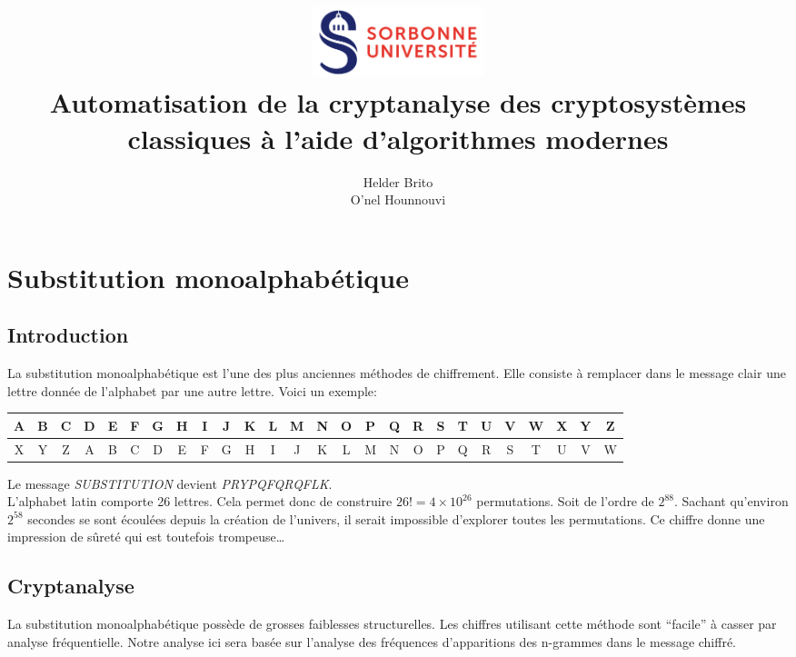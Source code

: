 \documentclass[a4paper]{article}
\title{
    \includegraphics[width=5cm]{logo_su.jpg} \\[1em]
    \Huge Automatisation de la cryptanalyse des cryptosystèmes classiques à l’aide d’algorithmes modernes
}
\author{Helder Brito\\O'nel Hounnouvi}
\date{}
\begin{document}
\maketitle 
\clearpage 
\tableofcontents
\clearpage 
\section{Substitution monoalphabétique}
\subsection{Introduction}
La substitution monoalphabétique est l'une des plus anciennes méthodes de chiffrement. Elle consiste
à remplacer dans le message clair une lettre donnée de l'alphabet par une autre lettre. Voici un exemple:

\vspace{1em}
    \begin{adjustbox}{width=\textwidth,center}
        \begin{tabular}{|c|c|c|c|c|c|c|c|c|c|c|c|c|c|c|c|c|c|c|c|c|c|c|c|c|c|}
            \hline
            A & B & C & D & E & F & G & H & I & J & K & L & M & N & O & P & Q & R & S & T & U & V & W & X & Y & Z \\
            \hline
            X & Y & Z & A & B & C & D & E & F & G & H & I & J & K & L & M & N & O & P & Q & R & S & T & U & V & W \\
            \hline
        \end{tabular}
    \end{adjustbox}
\vspace{1em}

Le message \textit{SUBSTITUTION} devient \textit{PRYPQFQRQFLK}.\\

L'alphabet latin comporte 26 lettres. Cela permet donc de construire $26! = 4 \times 10^{26}$ permutations. Soit de l'ordre de $2^{88}$.
Sachant qu'environ $2^{58}$ secondes se sont écoulées depuis la création de l'univers, il serait impossible d'explorer toutes les permutations.
Ce chiffre donne une impression de sûreté qui est toutefois trompeuse\ldots

\subsection{Cryptanalyse}
La substitution monoalphabétique possède de grosses faiblesses structurelles. Les chiffres utilisant cette méthode sont ``facile'' à casser par 
analyse fréquentielle. Notre analyse ici sera basée sur l'analyse des  fréquences d'apparitions des n-grammes dans le message chiffré. 
\end{document}
